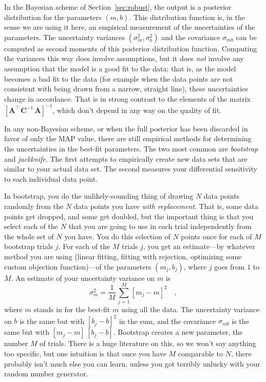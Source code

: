 \documentclass[12pt]{article}
\newcommand{\sectionname}{Section}
\newcommand{\mmatrix}[1]{\boldsymbol{#1}}
\newcommand{\inverse}[1]{{#1}^{-1}}
\newcommand{\transpose}[1]{{#1}^{\scriptscriptstyle \top}}
\newcommand{\mA}{\mmatrix{A}}
\newcommand{\mAT}{\transpose{\mA}}
\newcommand{\mC}{\mmatrix{C}}
\newcommand{\mCinv}{\inverse{\mC}}
\begin{document}
In the Bayesian scheme of \sectionname~\ref{sec:robust}, the output is
a posterior distribution for the parameters $(m,b)$.  This
distribution function is, in the sense we are using it here, an
empirical measurement of the uncertainties of the parameters.  The
uncertainty variances $(\sigma_m^2,\sigma_b^2)$ and the covariance
$\sigma_{mb}$ can be computed as second moments of this posterior
distribution function.  Computing the variances this way does involve
assumptions, but it does \emph{not} involve any assumption that the
model is a good fit to the data; that is, as the model becomes a bad
fit to the data (for example when the data points are not consistent
with being drawn from a narrow, straight line), these uncertainties
change in accordance.  That is in strong contrast to the elements of
the matrix $\inverse{\left[\mAT\,\mCinv\,\mA\right]}$, which don't
depend in any way on the quality of fit.

In any non-Bayesian scheme, or when the full posterior has been
discarded in favor of only the MAP value, there are still empirical
methods for determining the uncertainties in the best-fit parameters.
The two most common are \emph{bootstrap} and \emph{jackknife}.  The
first attempts to empirically create new data sets that are similar to
your actual data set.  The second measures your differential
sensitivity to each individual data point.

In bootstrap, you do the unlikely-sounding thing of drawing $N$ data
points randomly from the $N$ data points you have \emph{with
  replacement}.  That is, some data points get dropped, and some get
doubled, but the important thing is that you select each of the $N$
that you are going to use in each trial independently from the whole
set of $N$ you have.  You do this selection of $N$ points once for
each of $M$ bootstrap trials $j$.  For each of the $M$ trials $j$, you
get an estimate---by whatever method you are using (linear fitting,
fitting with rejection, optimizing some custom objection
function)---of the parameters $(m_j,b_j)$, where $j$ goes from $1$ to
$M$.  An estimate of your uncertainty variance on $m$ is
\begin{equation}
\sigma_m^2 = \frac{1}{M}\,\sum_{j=1}^M [m_j-m]^2 \quad ,
\end{equation}
where $m$ stands in for the best-fit $m$ using all the data.  The
uncertainty variance on $b$ is the same but with $[b_j-b]^2$ in the
sum, and the covariance $\sigma_{mb}$ is the same but with
$[m_j-m]\,[b_j-b]$.  Bootstrap creates a new parameter, the number $M$
of trials.  There is a huge literature on this, so we won't say
anything too specific, but one intuition is that once you have $M$
comparable to $N$, there probably isn't much else you can learn,
unless you got terribly unlucky with your random number generator.
\end{document}
